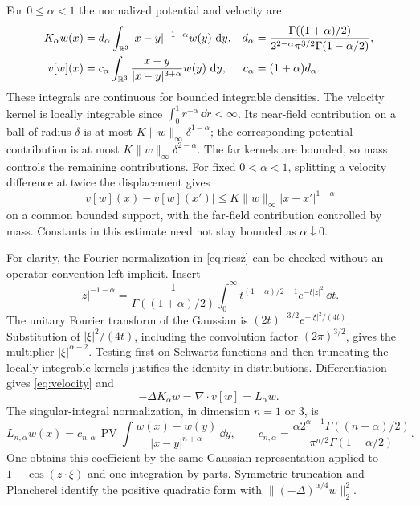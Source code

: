 For $0\leq\alpha<1$ the normalized potential and velocity are
\begin{align}
 K_\alpha w(x)&=d_\alpha\int_{\mathbb R^3}|x-y|^{-1-\alpha}w(y)\,\,\mathrm d y,
 &d_\alpha&=\frac{\Gamma((1+\alpha)/2)}
 {2^{2-\alpha}\pi^{3/2}\Gamma(1-\alpha/2)},\label{eq:riesz}\\
 v[w](x)&=c_\alpha\int_{\mathbb R^3}
 \frac{x-y}{|x-y|^{3+\alpha}}w(y)\,\,\mathrm d y,
 &c_\alpha&=(1+\alpha)d_\alpha.\label{eq:velocity}
\end{align}
These integrals are continuous for bounded integrable densities.
The velocity kernel is locally integrable since
$\int_0^1r^{-\alpha}\,\dd r<\infty$. Its near-field contribution on a ball
of radius $\delta$ is at most $K\|w\|_\infty\delta^{1-\alpha}$;
the corresponding potential contribution is at most
$K\|w\|_\infty\delta^{2-\alpha}$. The far kernels are bounded, so mass
controls the remaining contributions. For fixed $0<\alpha<1$, splitting a
velocity difference at twice the displacement gives
\begin{equation}\label{eq:velocity-holder}
 |v[w](x)-v[w](x')|\leq K\|w\|_\infty |x-x'|^{1-\alpha}
\end{equation}
on a common bounded support, with the far-field contribution controlled by
mass. Constants in this estimate need not stay bounded as $\alpha\downarrow0$.

For clarity, the Fourier normalization in \eqref{eq:riesz} can be checked
without an operator convention left implicit. Insert
\[
 |z|^{-1-\alpha}=\frac1{\Gamma((1+\alpha)/2)}
 \int_0^\infty t^{(1+\alpha)/2-1}e^{-t|z|^2}\,\dd t.
\]
The unitary Fourier transform of the Gaussian is
$(2t)^{-3/2}e^{-|\xi|^2/(4t)}$. Substitution of $|\xi|^2/(4t)$,
including the convolution factor $(2\pi)^{3/2}$, gives the multiplier
$|\xi|^{\alpha-2}$. Testing first on Schwartz functions and then truncating
the locally integrable kernels justifies the identity in distributions.
Differentiation gives \eqref{eq:velocity} and
\begin{equation}\label{eq:divv}
 -\Delta K_\alpha w=\nabla\cdot v[w]=L_\alpha w.
\end{equation}
The singular-integral normalization, in dimension $n=1$ or $3$, is
\begin{equation}\label{eq:frac-kernel}
 L_{n,\alpha}w(x)=c_{n,\alpha}\,\operatorname{PV}
 \int\frac{w(x)-w(y)}{|x-y|^{n+\alpha}}\,\dd y,
 \qquad c_{n,\alpha}=
 \frac{\alpha2^{\alpha-1}\Gamma((n+\alpha)/2)}
 {\pi^{n/2}\Gamma(1-\alpha/2)}.
\end{equation}
One obtains this coefficient by the same Gaussian representation applied to
$1-\cos(z\cdot\xi)$ and one integration by parts. Symmetric truncation and
Plancherel identify the positive quadratic form with
$\|(-\Delta)^{\alpha/4}w\|_2^2$.


